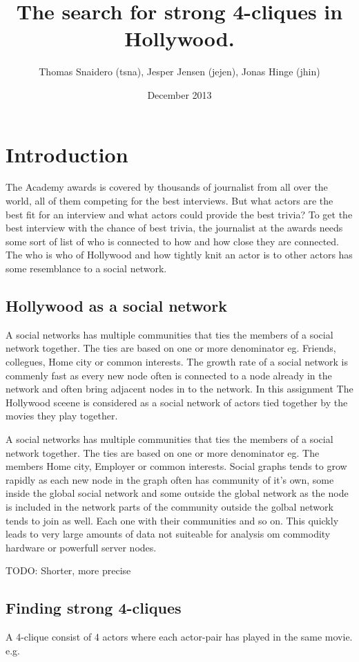 \documentclass{article}
\title{The search for strong 4-cliques in Hollywood.}
\author{Thomas Snaidero (tsna), Jesper Jensen (jejen), Jonas Hinge (jhin)}
\date{December 2013}
\begin{document}
\maketitle

\section{Introduction}
The Academy awards is covered by thousands of journalist from all over the world, all of them competing for the best interviews. But what actors are the best fit for an interview and what actors could provide the best trivia?
To get the best interview with the chance of best trivia, the journalist at the awards needs some sort of list of who is connected to how and how close they are connected. The who is who of Hollywood and how tightly knit an actor is to other actors has some resemblance to a social network.

\subsection{Hollywood as a social network}
A social networks has multiple communities that ties the members of a social network together. The ties are based on one or more denominator eg. Friends, collegues, Home city or common interests.
The growth rate of a social network is commenly fast as every new node often is connected to a node already in the network and often bring adjacent nodes in to the network. In this assignment The Hollywood sceene is considered as a social network of actors tied together by the movies they play together.

\noindent A social networks has multiple communities that ties the members of a social network together. The ties are based on one or more denominator eg. The members Home city, Employer or common interests. Social graphs tends to grow rapidly as each new node in the graph often has community of it's own, some inside the global social network and some outside the global network as the node is included in the network parts of the community outside the golbal network tends to join as well. Each one with their communities and so on. This quickly leads to very large amounts of data not suiteable for analysis om commodity hardware or powerfull server nodes.

TODO: Shorter, more precise


\subsection{Finding strong 4-cliques}
A 4-clique consist of 4 actors where each actor-pair has played in the same movie. e.g. 
\end{document}
